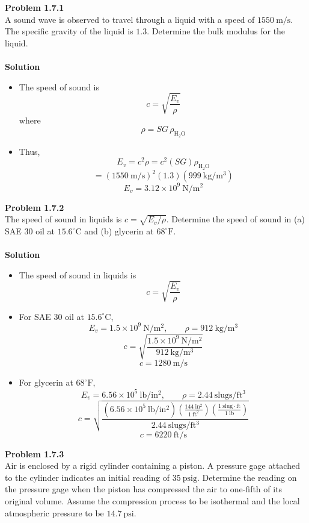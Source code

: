 ﻿\documentclass[12pt]{article}
\begin{document}
\section*{}
\textbf{Problem 1.7.1}\\
A sound wave is observed to travel through a liquid with a speed of $1550\ \mathrm{m/s}$. The specific gravity of the liquid is $1.3$. Determine the bulk modulus for the liquid.\\\\
\textbf{Solution}
\begin{itemize}
\item The speed of sound is
\[
c=\sqrt{\frac{E_v}{\rho}}
\]
where
\[
\rho=SG\,\rho_{\mathrm{H_2O}}
\]
\item Thus,
\[
E_v=c^2\rho=c^2(SG)\rho_{\mathrm{H_2O}}
\]
\[
=(1550\ \mathrm{m/s})^2(1.3)(999\ \mathrm{kg/m^3})
\]
\[
\boxed{E_v=3.12\times10^9\ \mathrm{N/m^2}}
\]
\end{itemize}
\textbf{Problem 1.7.2}\\
The speed of sound in liquids is $c=\sqrt{E_v/\rho}$. Determine the speed of sound in (a) SAE 30 oil at $15.6^\circ\mathrm{C}$ and (b) glycerin at $68^\circ\mathrm{F}$.\\\\
\textbf{Solution}
\begin{itemize}
\item The speed of sound in liquids is
\[
c=\sqrt{\frac{E_v}{\rho}}
\]
\item[(a)] For SAE 30 oil at $15.6^\circ\mathrm{C}$,
\[
E_v=1.5\times10^9\ \mathrm{N/m^2},\qquad \rho=912\ \mathrm{kg/m^3}
\]
\[
c=\sqrt{\frac{1.5\times10^9\ \mathrm{N/m^2}}{912\ \mathrm{kg/m^3}}}
\]
\[
\boxed{c=1280\ \mathrm{m/s}}
\]
\item[(b)] For glycerin at $68^\circ\mathrm{F}$,
\[
E_v=6.56\times10^5\ \mathrm{lb/in^2},\qquad \rho=2.44\ \mathrm{slugs/ft^3}
\]
\[
c=\sqrt{\frac{\left(6.56\times10^5\ \mathrm{lb/in^2}\right)\left(\frac{144\ \mathrm{in^2}}{1\ \mathrm{ft^2}}\right)\left(\frac{1\ \mathrm{slug\cdot ft}}{1\ \mathrm{lb}}\right)}{2.44\ \mathrm{slugs/ft^3}}}
\]
\[
\boxed{c=6220\ \mathrm{ft/s}}
\]
\end{itemize}
\textbf{Problem 1.7.3}\\
Air is enclosed by a rigid cylinder containing a piston. A pressure gage attached to the cylinder indicates an initial reading of $35\ \mathrm{psig}$. Determine the reading on the pressure gage when the piston has compressed the air to one-fifth of its original volume. Assume the compression process to be isothermal and the local atmospheric pressure to be $14.7\ \mathrm{psi}$.\\\\
\end{document}
